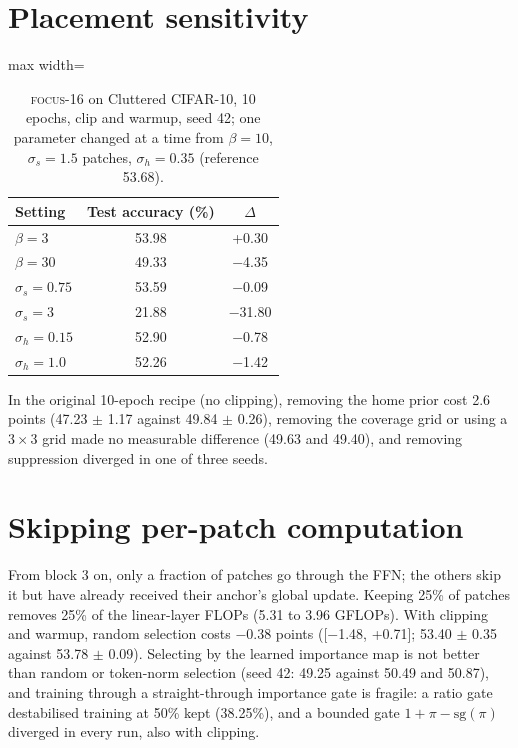 \documentclass[runningheads]{llncs}
\newcommand{\focus}{\textsc{focus}}
\begin{document}
\section{Placement sensitivity}
\label{app:sensitivity}
\begin{table}[h]
\centering
\caption{\focus-16 on Cluttered CIFAR-10, 10 epochs, clip and warmup, seed 42; one parameter
changed at a time from $\beta=10$, $\sigma_s=1.5$ patches, $\sigma_h=0.35$ (reference 53.68).}
\begin{adjustbox}{max width=\linewidth}
\begin{tabular}{lcc}
\toprule
Setting & Test accuracy (\%) & $\Delta$ \\
\midrule
$\beta=3$ & 53.98 & +0.30 \\
$\beta=30$ & 49.33 & $-$4.35 \\
$\sigma_s=0.75$ & 53.59 & $-$0.09 \\
$\sigma_s=3$ & 21.88 & $-$31.80 \\
$\sigma_h=0.15$ & 52.90 & $-$0.78 \\
$\sigma_h=1.0$ & 52.26 & $-$1.42 \\
\bottomrule
\end{tabular}
\end{adjustbox}
\end{table}
In the original 10-epoch recipe (no clipping), removing the home prior cost 2.6 points
(47.23 $\pm$ 1.17 against 49.84 $\pm$ 0.26), removing the coverage grid or using a $3\times3$ grid
made no measurable difference (49.63 and 49.40), and removing suppression diverged in one of
three seeds.

\section{Skipping per-patch computation}
\label{app:skipping}
From block 3 on, only a fraction of patches go through the FFN; the others skip it but have already
received their anchor's global update. Keeping 25\% of patches removes 25\% of the linear-layer
FLOPs (5.31 to 3.96 GFLOPs). With clipping and warmup, random selection costs $-$0.38 points
([$-$1.48, +0.71]; 53.40 $\pm$ 0.35 against 53.78 $\pm$ 0.09). Selecting by the learned importance
map is not better than random or token-norm selection (seed 42: 49.25 against 50.49 and 50.87),
and training through a straight-through importance gate is fragile: a ratio gate destabilised
training at 50\% kept (38.25\%), and a bounded gate $1+\pi-\mathrm{sg}(\pi)$ diverged in every
run, also with clipping.
\end{document}
